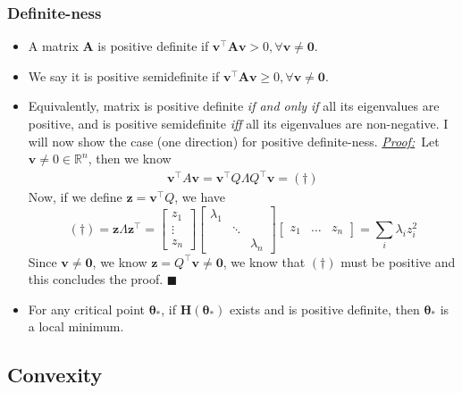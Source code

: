 \documentclass[11pt]{article}
\newcommand{\bv}{\mathbf{v}}
\newcommand{\bz}{\mathbf{z}}
\newcommand{\bzero}{\mathbf{0}}
\newcommand{\proof}{\tit{\underline{Proof:}}} %
\newcommand{\qed}{\hfill $\blacksquare$}
\newcommand{\real}{\mathbb{R}}
\newcommand{\tit}[1]{\textit{#1}}
\begin{document}
\subsubsection{Definite-ness}
\begin{itemize}
    \item A matrix $\mathbf{A}$ is positive definite if $\bv^\top\mathbf{A}\bv > 0, \forall \bv \neq \bzero$.
    \item We say it is positive semidefinite if $\bv^\top\mathbf{A}\bv \geq 0, \forall \bv \neq \bzero$.
    \item Equivalently, matrix is positive definite \textit{if and only if} all its eigenvalues are positive, and is positive semidefinite \textit{iff} all its eigenvalues are non-negative. I will now show the case (one direction) for positive definite-ness. \newline \proof\, Let $\bv \neq 0 \in \real^n$, then we know 
    \begin{align}
        \bv^\top A \bv 
        = \bv^\top Q\Lambda Q^\top \bv = (\dag)
    \end{align}
    Now, if we define $\bz = \bv^\top Q$, we have
    \begin{equation}
        (\dag) = \bz \Lambda \bz^\top
        = \begin{bmatrix}
            z_1 \\ \vdots \\ z_n
        \end{bmatrix}\begin{bmatrix}
            \lambda_1 & & \\
            & \ddots & \\
            & & \lambda_n
        \end{bmatrix}\begin{bmatrix}
            z_1 & \dots & z_n
        \end{bmatrix}
        = \sum_i \lambda_i z_i^2
    \end{equation}
    Since $\bv \neq \bzero$, we know $\bz = Q^\top \bv \neq \bzero$, we know that $(\dag)$ must be positive and this concludes the proof. \qed
    \item For any critical point $\boldsymbol{\theta}_*$, if $\mathbf{H}(\boldsymbol{\theta}_*)$ exists and is positive definite, then $\boldsymbol{\theta}_\ast$ is a local minimum. 
\end{itemize}

\subsection{Convexity}
\end{document}
